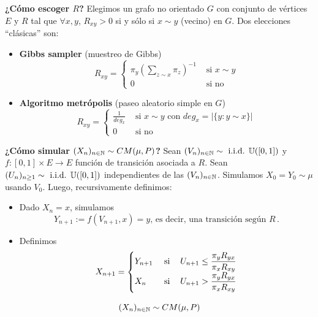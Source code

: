 \newp \textbf{¿Cómo escoger $R$?}
\newline Elegimos un grafo no orientado $G$ con conjunto de vértices $E$ y  $R$ tal que $\forall x,y$, $R_{xy}>0$ si y sólo si $x \sim y$ (vecino) en $G$.
\newline Dos elecciones ``clásicas'' son:
\begin{itemize}
    \item \textbf{Gibbs sampler} (muestreo de Gibbs)
    $$ R_{xy}=\begin{cases}
    \pi_{y}(\displaystyle\sum_{z\sim x}\pi_z)^{-1}  & \mbox{ si }x\sim y\\
    0  & \mbox{ si no}
    \end{cases}$$
    \item \textbf{Algoritmo metrópolis} (paseo aleatorio simple en $G$)
    $$ R_{xy}=\begin{cases}
    \displaystyle\frac{1}{deg_x} & \mbox{ si }x\sim y\mbox{ con }deg_x=|\{y:y\sim x\}|\\
    0  & \mbox{ si no}
    \end{cases}$$
\end{itemize}
\label{m-h}
\textbf{¿Cómo simular $(X_n)_{n\in\mathbb{N}}\sim CM(\mu,P)$?}
\newline Sean $(V_n)_{n\in\mathbb{N}}\sim\mbox{ i.i.d. } \mathbb{U}([0,1])$ y $f:[0,1]\times E\to E$ función de transición asociada a $R$.
\newline Sean $(U_n)_{n\geq 1}\sim \mbox{ i.i.d. }\mathbb{U}([0,1])$ independientes de las $(V_n)_{n\in\mathbb{N}}$. Simulamos $X_0=Y_0\sim\mu$ usando $V_0$.
\newline Luego, recursivamente definimos:
\begin{itemize}
    \item Dado $X_n=x$, simulamos
    $$ Y_{n+1}:=f(V_{n+1},x)=y \mbox{, es decir, una transición según }R\,.$$
    \item Definimos
    $$ X_{n+1}=\begin{cases}
    Y_{n+1}  & \mbox{ si } \hspace{.25cm}\, U_{n+1}\leq \displaystyle\frac{\pi_y R_{yx}}{\pi_x R_{xy}}  \\
    X_n  & \mbox{ si } \hspace{.25cm}\, U_{n+1}> \displaystyle\frac{\pi_y R_{yx}}{\pi_x R_{xy}}
    \end{cases}$$
\end{itemize}
\begin{proposition}
$$ (X_n)_{n\in\mathbb{N}}\sim CM(\mu,P)$$
\end{proposition}
